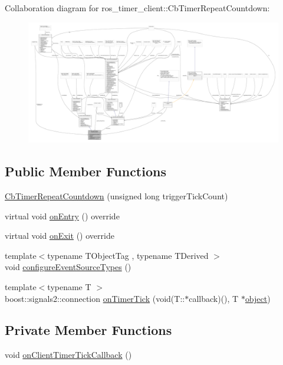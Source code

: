 Collaboration diagram for ros\+\_\+timer\+\_\+client\+:\+:Cb\+Timer\+Repeat\+Countdown\+:
\nopagebreak
\begin{figure}[H]
\begin{center}
\leavevmode
\includegraphics[width=350pt]{classros__timer__client_1_1CbTimerRepeatCountdown__coll__graph}
\end{center}
\end{figure}
\subsection*{Public Member Functions}
\begin{DoxyCompactItemize}
\item 
\hyperlink{classros__timer__client_1_1CbTimerRepeatCountdown_a26a8ca055744f353adfbba4a3e3faf3b}{Cb\+Timer\+Repeat\+Countdown} (unsigned long trigger\+Tick\+Count)
\item 
virtual void \hyperlink{classros__timer__client_1_1CbTimerRepeatCountdown_a605db5c7a861d214d5f9bccfbab5c9ab}{on\+Entry} () override
\item 
virtual void \hyperlink{classros__timer__client_1_1CbTimerRepeatCountdown_ac03676bee050ee3978267f352af80b3a}{on\+Exit} () override
\item 
{\footnotesize template$<$typename T\+Object\+Tag , typename T\+Derived $>$ }\\void \hyperlink{classros__timer__client_1_1CbTimerRepeatCountdown_a1ff1893e9a864a4c6bdcbec3cb9ebf07}{configure\+Event\+Source\+Types} ()
\item 
{\footnotesize template$<$typename T $>$ }\\boost\+::signals2\+::connection \hyperlink{classros__timer__client_1_1CbTimerRepeatCountdown_a33ce52ebbad96fc31b74c957bfddf0c1}{on\+Timer\+Tick} (void(T\+::$\ast$callback)(), T $\ast$\hyperlink{classobject}{object})
\end{DoxyCompactItemize}
\subsection*{Private Member Functions}
\begin{DoxyCompactItemize}
\item 
void \hyperlink{classros__timer__client_1_1CbTimerRepeatCountdown_ab9fdad214cdb0f504cbbe68692cacd4e}{on\+Client\+Timer\+Tick\+Callback} ()
\end{DoxyCompactItemize}
